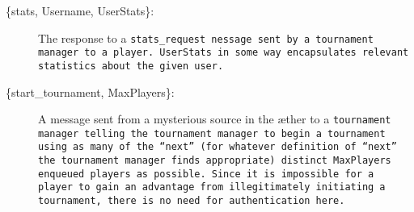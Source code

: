 \documentclass[12pt,letterpaper]{article}
\newcommand{\tm}{\tt{tournament manager}}
\newcommand{\pl}{\tt{player}}
\begin{document}
\begin{description}
\item[\{stats, Username, UserStats\}:] The response to a \tt{stats\_request} nessage sent by a \tm{} to a \pl{}.  \tt{UserStats} in some way encapsulates relevant statistics about the given user.

\item[\{start\_tournament, MaxPlayers\}:] A message sent from a mysterious source in the \ae ther to a \tm{} telling the \tm{} to begin a tournament using as many of the ``next'' (for whatever definition of ``next'' the \tm{} finds appropriate) distinct \tt{MaxPlayers} enqueued players as possible.  Since it is impossible for a \pl{} to gain an advantage from illegitimately initiating a tournament, there is no need for authentication here.

%
%


\end{description}
\end{document}
